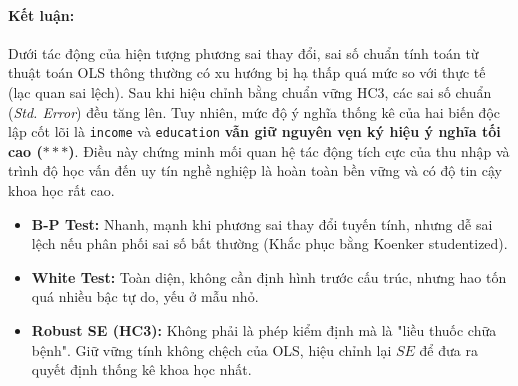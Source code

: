 	\paragraph{Kết luận:}
	Dưới tác động của hiện tượng phương sai thay đổi, sai số chuẩn tính toán từ thuật toán OLS thông thường có xu hướng bị hạ thấp quá mức so với thực tế (lạc quan sai lệch). Sau khi hiệu chỉnh bằng chuẩn vững HC3, các sai số chuẩn (\textit{Std. Error}) đều tăng lên. Tuy nhiên, mức độ ý nghĩa thống kê của hai biến độc lập cốt lõi là \texttt{income} và \texttt{education} \textbf{vẫn giữ nguyên vẹn ký hiệu ý nghĩa tối cao ($***$)}. Điều này chứng minh mối quan hệ tác động tích cực của thu nhập và trình độ học vấn đến uy tín nghề nghiệp là hoàn toàn bền vững và có độ tin cậy khoa học rất cao.
	\begin{itemize}
		\item \textbf{B-P Test:} Nhanh, mạnh khi phương sai thay đổi tuyến tính, nhưng dễ sai lệch nếu phân phối sai số bất thường (Khắc phục bằng Koenker studentized).
		\item \textbf{White Test:} Toàn diện, không cần định hình trước cấu trúc, nhưng hao tốn quá nhiều bậc tự do, yếu ở mẫu nhỏ.
		\item \textbf{Robust SE (HC3):} Không phải là phép kiểm định mà là "liều thuốc chữa bệnh". Giữ vững tính không chệch của OLS, hiệu chỉnh lại $SE$ để đưa ra quyết định thống kê khoa học nhất.
	\end{itemize}

